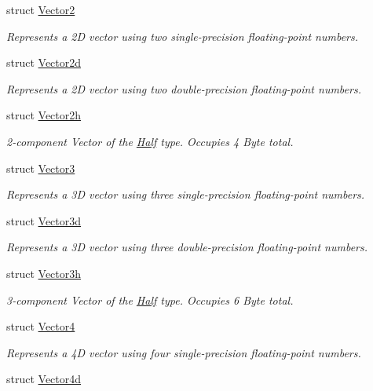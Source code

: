 \begin{DoxyCompactItemize}
struct \hyperlink{struct_open_t_k_1_1_vector2}{Vector2}
\begin{DoxyCompactList}\small\item\em Represents a 2\-D vector using two single-\/precision floating-\/point numbers.\end{DoxyCompactList}\item 
struct \hyperlink{struct_open_t_k_1_1_vector2d}{Vector2d}
\begin{DoxyCompactList}\small\item\em Represents a 2\-D vector using two double-\/precision floating-\/point numbers.\end{DoxyCompactList}\item 
struct \hyperlink{struct_open_t_k_1_1_vector2h}{Vector2h}
\begin{DoxyCompactList}\small\item\em 2-\/component Vector of the \hyperlink{struct_open_t_k_1_1_half}{Half} type. Occupies 4 Byte total.\end{DoxyCompactList}\item 
struct \hyperlink{struct_open_t_k_1_1_vector3}{Vector3}
\begin{DoxyCompactList}\small\item\em Represents a 3\-D vector using three single-\/precision floating-\/point numbers. \end{DoxyCompactList}\item 
struct \hyperlink{struct_open_t_k_1_1_vector3d}{Vector3d}
\begin{DoxyCompactList}\small\item\em Represents a 3\-D vector using three double-\/precision floating-\/point numbers. \end{DoxyCompactList}\item 
struct \hyperlink{struct_open_t_k_1_1_vector3h}{Vector3h}
\begin{DoxyCompactList}\small\item\em 3-\/component Vector of the \hyperlink{struct_open_t_k_1_1_half}{Half} type. Occupies 6 Byte total. \end{DoxyCompactList}\item 
struct \hyperlink{struct_open_t_k_1_1_vector4}{Vector4}
\begin{DoxyCompactList}\small\item\em Represents a 4\-D vector using four single-\/precision floating-\/point numbers.\end{DoxyCompactList}\item 
struct \hyperlink{struct_open_t_k_1_1_vector4d}{Vector4d}

\end{DoxyCompactItemize}
